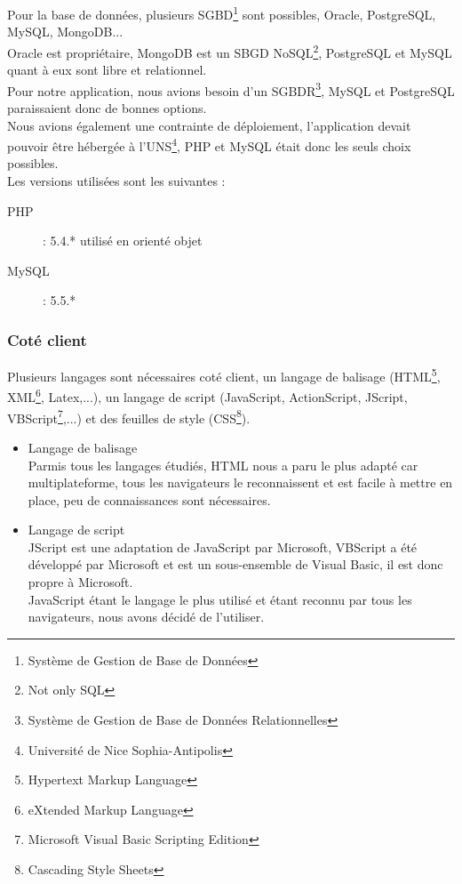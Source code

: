 \documentclass{sigplanconf}
\begin{document}
Pour la base de données, plusieurs SGBD\footnote{Système de Gestion de Base de Données} sont possibles, Oracle, PostgreSQL, MySQL, MongoDB...\\
Oracle est propriétaire, MongoDB est un SBGD NoSQL\footnote{Not only SQL}, PostgreSQL et MySQL quant à eux sont libre et relationnel.\\
Pour notre application, nous avions besoin d'un SGBDR\footnote{Système de Gestion de Base de Données Relationnelles}, MySQL et PostgreSQL paraissaient donc de bonnes options.\\

Nous avions également une contrainte de déploiement, l'application devait pouvoir être hébergée à l'UNS\footnote{Université de Nice Sophia-Antipolis}, PHP\cite{urlPHP} et MySQL\cite{urlMySQL} était donc les seuls choix possibles.\\
Les versions utilisées sont les suivantes : 
\begin{description}
\item [PHP] : 5.4.* utilisé en orienté objet
\item [MySQL] : 5.5.*
\end{description}

\subsubsection{Coté client}\label{langagesClient}
Plusieurs langages sont nécessaires coté client, un langage de balisage (HTML\footnote{Hypertext Markup Language}, XML\footnote{eXtended Markup Language}, Latex,...), un langage de script (JavaScript, ActionScript, JScript, VBScript\footnote{Microsoft Visual Basic Scripting Edition},...) et des feuilles de style (CSS\footnote{Cascading Style Sheets}).
\begin{itemize}
\item Langage de balisage\\
Parmis tous les langages étudiés, HTML nous a paru le plus adapté car multiplateforme, tous les navigateurs le reconnaissent et est facile à mettre en place, peu de connaissances sont nécessaires.
\item Langage de script\\
JScript est une adaptation de JavaScript par Microsoft, VBScript a été développé par Microsoft et est un sous-ensemble de Visual Basic, il est donc propre à Microsoft.\\
JavaScript étant le langage le plus utilisé et étant reconnu par tous les navigateurs, nous avons décidé de l'utiliser.
\end{itemize}
\end{document}
